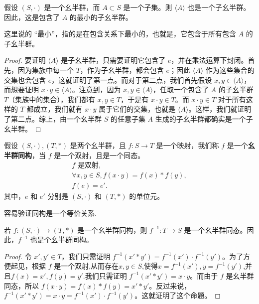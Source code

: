 \documentclass[../../main.tex]{subfiles}
\begin{document}
\begin{proposition}
假设 $(S, \cdot)$ 是一个幺半群，而 $A \subset S$ 是一个子集。则 $\langle A \rangle$ 也是一个子幺半群。因此，这是包含了 $A$ 的最小的子幺半群。
\end{proposition}
\begin{remark}
这里说的 “最小”，指的是在包含关系下最小的，也就是，它包含于所有包含 $A$ 的子幺半群。
\end{remark}
\begin{proof}
要证明 $\langle A \rangle$ 是子幺半群，只需要证明它包含了 $e$，并在乘法运算下封闭。首先，因为集族中每一个 $T$，作为子幺半群，都会包含 $e$；因此 $\langle A \rangle$ 作为这些集合的交集也会包含 $e$，这就证明了第一点。而对于第二点，我们首先假设 $x, y \in \langle A \rangle$，而想要证明 $x \cdot y \in \langle A \rangle$。注意到，因为 $x, y \in \langle A \rangle$，任取一个包含了 $A$ 的子幺半群 $T$（集族中的集合），我们都有 $x, y \in T$，于是有 $x \cdot y \in T$。而 $x \cdot y \in T$ 对于所有这样的 $T$ 都成立，我们就有 $x \cdot y$ 属于它们的交集，也就是 $\langle A \rangle$。这样，我们就证明了第二点。综上，由一个幺半群 $S$ 的任意子集 $A$ 生成的子幺半群都确实是一个子幺半群。 
\end{proof}

\begin{definition}[幺半群同构]
假设 $(S, \cdot), (T, *)$ 是两个幺半群，且 $f : S \to T$ 是一个映射，我们称 $f$ 是一个\textbf{幺半群同构}，当 $f$ 是一个双射，且是一个同态。
\begin{gather*}
f \text{ 是双射} ,\\
\forall x, y \in S, f(x \cdot y) = f(x) * f(y) ,\\
f(e) = e' .
\end{gather*}
其中，$e$ 和 $e'$ 分别是 $(S, \cdot)$ 和 $(T, *)$ 的单位元。 
\end{definition}
\begin{remark}
容易验证同构是一个等价关系.
\end{remark}

\begin{proposition}[幺半群同构的逆映射一定是幺半群同态]\label{proposition:幺半群同构的逆映射一定是幺半群同态}
若 $f : (S, \cdot) \to (T, *)$ 是一个幺半群同构，则 $f^{-1} : T \to S$ 是一个幺半群同态。因此，$f^{-1}$ 也是个幺半群同构。
\end{proposition}
\begin{proof}
令 $x', y' \in T$，我们只需证明 $f^{-1}(x' * y') = f^{-1}(x') \cdot f^{-1}(y')$。为了方便起见，根据 $f$ 是一个双射,从而存在$x,y\in S$,使得$x = f^{-1}(x'), y = f^{-1}(y')$,并且$f(x)=x',f(y)=y'$.我们只需证明 $f^{-1}(x' * y') = x \cdot y$。而由于 $f$ 是幺半群同态，所以 $f(x \cdot y) = f(x) * f(y) = x' * y'$。反过来说，$f^{-1}(x' * y') = x \cdot y = f^{-1}(x') \cdot f^{-1}(y')$。这就证明了这个命题。 
\end{proof}
\end{document}
